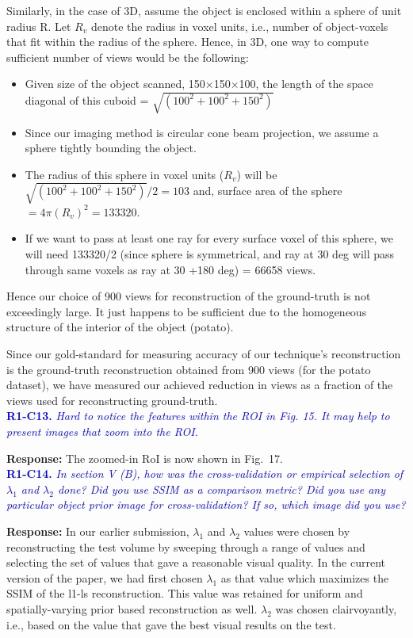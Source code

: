 \documentclass{article}
\begin{document}
Similarly, in the case of 3D, assume the object is enclosed within a sphere of unit radius R. Let $R_v$ denote the radius in voxel units, i.e., number of object-voxels that fit within the radius of the sphere. Hence, in 3D, one way to compute sufficient number of views would be the following:
\begin{itemize}
\item Given size of the object scanned, 150$\times$150$\times$100, the length of the space diagonal of this cuboid = $\sqrt{(100^2 + 100^2 + 150^2)}$
\item Since our imaging method is circular cone beam projection, we assume a sphere tightly bounding the object.
\item The radius of this sphere in voxel units ($R_v$) will be $\sqrt{(100^2 + 100^2 + 150^2)}/2 = 103$
and, surface area of the sphere $= 4\pi (R_v)^2 = 133320$.
\item If we want to pass at least one ray for every surface voxel of this sphere, we will need 133320/2 (since sphere is symmetrical, and ray at 30 deg will pass through same voxels as ray at 30 +180 deg) = 66658 views. 
\end{itemize}
Hence our choice of 900 views for reconstruction of the ground-truth is not exceedingly large. It just happens to be sufficient due to the homogeneous structure of the interior of the object (potato).

Since our gold-standard for measuring accuracy of our technique's reconstruction is the ground-truth reconstruction obtained from 900 views (for the potato dataset), we have measured our achieved reduction in views as a fraction of the views used for reconstructing ground-truth. \\

\textcolor{blue}{\textbf{R1-C13.}\textit{ Hard to notice the features within the ROI in Fig. 15. It may help to present images that zoom into the ROI.}}
    
\textbf{Response:} The zoomed-in RoI is now shown in Fig.~17. \\

\textcolor{blue}{\textbf{R1-C14.}\textit{ In section V (B), how was the cross-validation or empirical selection of $\lambda_1$ and $\lambda_2$ done? Did you use SSIM as a comparison metric? Did you use any particular object prior image for cross-validation? If so, which image did you use? }}

\textbf{Response:} In our earlier submission, $\lambda_1$ and $\lambda_2$ values were chosen by reconstructing the test volume by sweeping through a range of values and selecting the set of values that gave a reasonable visual quality. In the current version of the paper, we had first chosen $\lambda_1$ as that value which maximizes the SSIM of the l1-ls reconstruction. This value was retained for uniform and spatially-varying prior based reconstruction as well. $\lambda_2$ was chosen clairvoyantly,  i.e., based on the value that gave the best visual results on the test.\\
\end{document}
